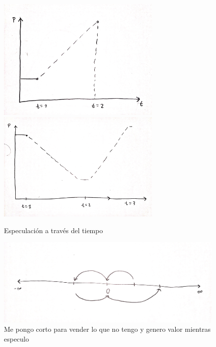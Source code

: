 \begin{figure}[htbp]
    \centering
    \includegraphics[width=8cm]{Classes/Images/2019-08-05-01.jpg}
    \includegraphics[width=8cm]{Classes/Images/2019-08-05-02.jpg}
    \caption{Especulación a través del tiempo}

    \includegraphics[width=12cm]{Classes/Images/2019-08-05-03.jpg}
    \caption{Me pongo corto para vender lo que no tengo y genero valor mientras especulo}
    \label{}
\end{figure} 


